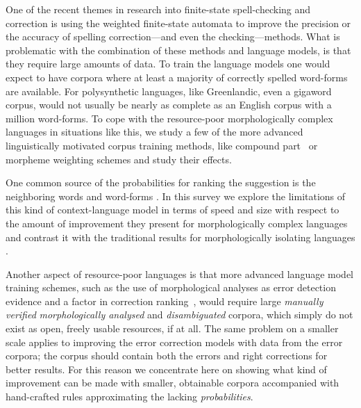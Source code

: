 \documentclass[a4paper,12pt]{article}
\begin{document}
One of the recent themes in research into finite-state spell-checking and
correction is using the weighted finite-state automata to improve the precision
or the accuracy of spelling correction---and even the checking---methods.
What is problematic with the combination of these methods and language models,
is that they require large amounts of data. To train the language models one
would expect to have corpora where at least a majority of correctly spelled
word-forms are available.  For polysynthetic languages, like Greenlandic, even
a gigaword corpus, would not usually be nearly as complete as an English corpus
with a million word-forms. To cope with the resource-poor morphologically
complex languages in situations like this, we study a few of the more
advanced linguistically motivated corpus training methods, like compound
part~\cite[]{pirinen/2009/nodalida} or morpheme weighting schemes and study
their effects.

One common source of the probabilities for ranking the suggestion is the
neighboring words and word-forms \cite[]{pirinen2012improving,otero/2007}.  In
this survey we explore the limitations of this kind of context-language model
in terms of speed and size with respect to the amount of improvement they
present for morphologically complex languages and contrast it with the
traditional results for morphologically isolating languages
\cite[]{mays/1991,wilcoxohearn2008realword}.

Another aspect of resource-poor languages is that more advanced language model
training schemes, such as the use of morphological analyses as error detection
evidence \cite[]{mays/1991} and a factor in correction
ranking~\cite[]{otero/2007}, would require large \emph{manually verified}
\emph{morphologically analysed} and \emph{disambiguated} corpora, which simply
do not exist as open, freely usable resources, if at all. The same problem on a
smaller scale applies to improving the error correction models with data from
the error corpora; the corpus should contain both the errors and right
corrections for better results. For this reason we concentrate here on showing
what kind of improvement can be made with smaller, obtainable corpora
accompanied with hand-crafted rules approximating the lacking
\emph{probabilities}.
\end{document}
